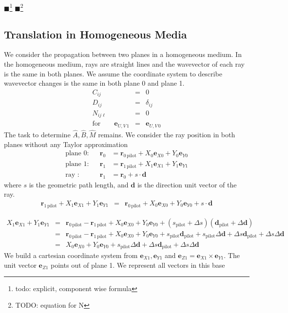 \documentclass[12pt,a4paper,twoside,openright,BCOR10mm,headsepline,titlepage,abstracton,chapterprefix,final]{scrreprt}
\newcommand\Vector[1]{{\mathbf{#1}}}
\newcommand\Location{\Vector{r}}
\newcommand{\remark}[1]{{\color{red}$\blacksquare$}\footnote{{\color{red}#1}}}
\newcommand\pilot{\textrm{pilot}}
\begin{document}
\remark{todo: explicit, component wise formula}
\remark{TODO: equation for N}

\subsection{Translation in Homogeneous Media}
We consider the propagation between two planes in a homogeneous medium.
In the homogeneous medium, rays are straight lines and the wavevector of each ray is the same in both planes.
We assume the coordinate system to describe wavevector changes is the same in both plane 0 and plane 1.
\begin{eqnarray}
C_{ij} &=& 0 \\
D_{ij} &=& \delta_{ij} \\
N_{ij\ell} &=& 0 \\
\text{for}\qquad \Vector{e}_{U,V\,1} &=& \Vector{e}_{U,V\,0} \nonumber
\end{eqnarray}
The task to determine $\hat{A},\hat{B}, \hat{M}$ remains. 
We consider the ray position in both planes without any Taylor approximation
\begin{align}
 \text{plane 0:} && \Location_0 &= \Location_{0\,\pilot} + X_0 \Vector{e}_{X0} + Y_0 \Vector{e}_{Y0} \\
 \text{plane 1:} && \Location_1 &= \Location_{1\,\pilot} + X_1 \Vector{e}_{X1} + Y_1 \Vector{e}_{Y1} \\
 \text{ray :} && \Location_1 &= \Location_{0} + s \cdot \Vector{d}
\end{align}
where $s$ is the geometric path length, and $\Vector{d}$ is the direction unit vector of the ray.
\begin{eqnarray}
\Location_{1\,\pilot} + X_1 \Vector{e}_{X1} + Y_1 \Vector{e}_{Y1} &=& \Location_{0\,\pilot} + X_0 \Vector{e}_{X0} + Y_0 \Vector{e}_{Y0}  + s \cdot \Vector{d}
\end{eqnarray}

\begin{eqnarray}
  X_1 \Vector{e}_{X1} + Y_1 \Vector{e}_{Y1} 
  &=& 
  \Location_{0\,\pilot} - \Location_{1\,\pilot} + X_0 \Vector{e}_{X0} + Y_0 \Vector{e}_{Y0}  + (s_{\pilot} + \Delta s) ( \Vector{d}_{\pilot} + \Delta \Vector{d} )
\\
  &=& 
  \Location_{0\,\pilot} - \Location_{1\,\pilot} + X_0 \Vector{e}_{X0} + Y_0 \Vector{e}_{Y0}  
  + s_{\pilot} \Vector{d}_{\pilot} 
  + s_{\pilot} \Delta \Vector{d} 
  + \Delta s \Vector{d}_{\pilot}
  + \Delta s \Delta \Vector{d}
\\
  &=& 
  X_0 \Vector{e}_{X0} + Y_0 \Vector{e}_{Y0}  
  + s_{\pilot} \Delta \Vector{d} 
  + \Delta s \Vector{d}_{\pilot}
  + \Delta s \Delta \Vector{d}
\end{eqnarray}
We build a cartesian coordinate system from $\Vector{e}_{X1}, \Vector{e}_{Y1}$ and $\Vector{e}_{Z1} = \Vector{e}_{X1} \times \Vector{e}_{Y1}$.
The unit vector $\Vector{e}_{Z1}$ points out of plane 1. We represent all vectors in this base
\end{document}
